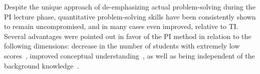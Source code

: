 \documentclass[twocolumn,secnumarabic,amssymb, nobibnotes, aps, prd]{revtex4-2}
\begin{document}
%
    
    Despite the unique approach of de-emphasizing actual problem-solving during the PI lecture phase, quantitative problem-solving skills have been consistently shown to remain uncompromised, and in many cases even improved, relative to TI.
    Several advantages were pointed out in favor of the PI method in relation to the following dimensions: decrease in the number of students with extremely low scores~\cite{crouch2001peer,lasry2008peer,thacker1994comparing}, improved conceptual understanding~\cite{crouch2001peer}, as well as being independent of the background knowledge~\cite{lasry2008peer,tobias1990they}.



\end{document}
